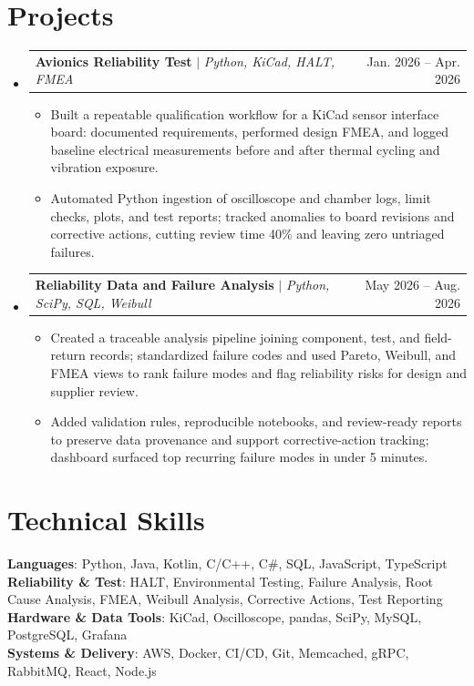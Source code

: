 \documentclass[letterpaper,11pt]{article}
\makeatletter
\newcommand{\resumeItem}[1]{
  \item\small{
    {#1 \vspace{-2pt}}
  }
}
\newcommand{\resumeProjectHeading}[2]{
    \item
    \begin{tabular*}{0.97\textwidth}{l@{\extracolsep{\fill}}r}
      \small#1 & #2 \\
    \end{tabular*}\vspace{-7pt}
}
\newcommand{\resumeSubHeadingListStart}{\begin{itemize}[leftmargin=0.15in, label={}]}
\newcommand{\resumeSubHeadingListEnd}{\end{itemize}}
\newcommand{\resumeItemListStart}{\begin{itemize}}
\newcommand{\resumeItemListEnd}{\end{itemize}\vspace{-5pt}}
\makeatother
\begin{document}
\section{Projects}
\resumeSubHeadingListStart
\resumeProjectHeading
{\textbf{Avionics Reliability Test} $|$ \emph{Python, KiCad, HALT, FMEA}}{Jan. 2026 -- Apr. 2026}
\resumeItemListStart
\resumeItem{Built a repeatable qualification workflow for a KiCad sensor interface board: documented requirements, performed design FMEA, and logged baseline electrical measurements before and after thermal cycling and vibration exposure.}
\resumeItem{Automated Python ingestion of oscilloscope and chamber logs, limit checks, plots, and test reports; tracked anomalies to board revisions and corrective actions, cutting review time 40\% and leaving zero untriaged failures.}
\resumeItemListEnd
\resumeProjectHeading
{\textbf{Reliability Data and Failure Analysis} $|$ \emph{Python, SciPy, SQL, Weibull}}{May 2026 -- Aug. 2026}
\resumeItemListStart
\resumeItem{Created a traceable analysis pipeline joining component, test, and field-return records; standardized failure codes and used Pareto, Weibull, and FMEA views to rank failure modes and flag reliability risks for design and supplier review.}
\resumeItem{Added validation rules, reproducible notebooks, and review-ready reports to preserve data provenance and support corrective-action tracking; dashboard surfaced top recurring failure modes in under 5 minutes.}
\resumeItemListEnd
\resumeSubHeadingListEnd

\section{Technical Skills}
\begin{itemize}[leftmargin=0.15in, label={}]
  \small{\item{
        \textbf{Languages}{: Python, Java, Kotlin, C/C++, C\#, SQL, JavaScript, TypeScript} \\
        \textbf{Reliability \& Test}{: HALT, Environmental Testing, Failure Analysis, Root Cause Analysis, FMEA, Weibull Analysis, Corrective Actions, Test Reporting} \\
        \textbf{Hardware \& Data Tools}{: KiCad, Oscilloscope, pandas, SciPy, MySQL, PostgreSQL, Grafana} \\
        \textbf{Systems \& Delivery}{: AWS, Docker, CI/CD, Git, Memcached, gRPC, RabbitMQ, React, Node.js}
        }}
\end{itemize}
\end{document}
